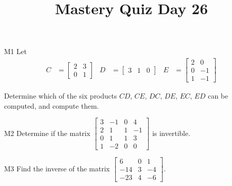 \documentclass{sbgLAquiz}
\title{Mastery Quiz Day 26 }
\begin{document}
\begin{problem}{M1}
Let
\begin{align*}
C &= \begin{bmatrix} 2 & 3 \\ 0 & 1 \end{bmatrix} & D&= \begin{bmatrix} 3 & 1 & 0 \end{bmatrix} & E&= \begin{bmatrix} 2 & 0 \\ 0 & -1 \\ 1 & -1 \end{bmatrix}
\end{align*}

Determine which of the six products $CD$, $CE$, $DC$, $DE$, $EC$, $ED$ can be computed, and compute them.
\end{problem}

\begin{problem}{M2}
Determine if the matrix $\begin{bmatrix} 3 & -1 & 0 & 4 \\ 2 & 1 & 1 & -1 \\ 0 & 1 & 1 & 3 \\ 1 & -2 & 0 & 0 \end{bmatrix}$ is invertible.
\end{problem}
\newpage

\begin{problem}{M3} Find the inverse of the matrix $\begin{bmatrix} 6 & 0 & 1 \\ -14 & 3 & -4 \\ -23 & 4 & -6\end{bmatrix}$.
\end{problem}
\end{document}
